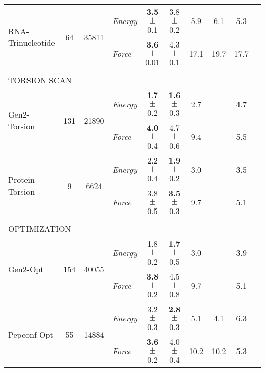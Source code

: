 \documentclass[varwidth]{standalone}
\newcommand{\widthbetweentype}{7pt}
\begin{document}
\begin{adjustbox}{width=\textwidth,center}
\begin{tabular}{l c c l c c c c c c}
\hline
\multirow{2}{*}{RNA-Trinucleotide} & \multirow{2}{*}{64} & \multirow{2}{*}{35811} & \textit{Energy} & \textbf{3.5} $\pm$ 0.1 & 3.8 $\pm$ 0.2 & 5.9 & 6.1 & 5.3\\
                                   &                       &                         & \textit{Force}  & \textbf{3.6} $\pm$ 0.01 & 4.3 $\pm$ 0.1 & 17.1 & 19.7 & 17.7\\
\hline
\multicolumn{8}{l}{\vspace{\widthbetweentype}} \\[-1em]
\multicolumn{8}{l}{\small{TORSION SCAN}} \\\hline
\multirow{2}{*}{Gen2-Torsion} & \multirow{2}{*}{131} & \multirow{2}{*}{21890} & \textit{Energy} & 1.7 $\pm$ 0.2 & \textbf{1.6} $\pm$ 0.3 & 2.7 &  & 4.7\\
                                   &                       &                         & \textit{Force}  & \textbf{4.0} $\pm$ 0.4 & 4.7 $\pm$ 0.6 & 9.4 &  & 5.5\\
\hline
\multirow{2}{*}{Protein-Torsion} & \multirow{2}{*}{9} & \multirow{2}{*}{6624} & \textit{Energy} & 2.2 $\pm$ 0.4 & \textbf{1.9} $\pm$ 0.2 & 3.0 &  & 3.5\\
                                   &                       &                         & \textit{Force}  & 3.8 $\pm$ 0.5 & \textbf{3.5} $\pm$ 0.3 & 9.7 &  & 5.1\\
\hline
\multicolumn{8}{l}{\vspace{\widthbetweentype}} \\[-1em]
\multicolumn{8}{l}{\small{OPTIMIZATION}} \\\hline
\multirow{2}{*}{Gen2-Opt} & \multirow{2}{*}{154} & \multirow{2}{*}{40055} & \textit{Energy} & 1.8 $\pm$ 0.2 & \textbf{1.7} $\pm$ 0.5 & 3.0 &  & 3.9\\
                                   &                       &                         & \textit{Force}  & \textbf{3.8} $\pm$ 0.2 & 4.5 $\pm$ 0.8 & 9.7 &  & 5.1\\
\hline
\multirow{2}{*}{Pepconf-Opt} & \multirow{2}{*}{55} & \multirow{2}{*}{14884} & \textit{Energy} & 3.2 $\pm$ 0.3 & \textbf{2.8} $\pm$ 0.3 & 5.1 & 4.1 & 6.3\\
                                   &                       &                         & \textit{Force}  & \textbf{3.6} $\pm$ 0.2 & 4.0 $\pm$ 0.4 & 10.2 & 10.2 & 5.3\\
\hline
\hline
\hline
\end{tabular}


\end{adjustbox}
\end{document}
